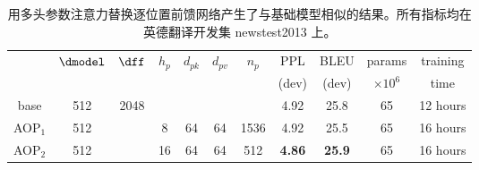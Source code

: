 \begin{table}[h]
\caption{用多头参数注意力替换逐位置前馈网络产生了与基础模型相似的结果。所有指标均在英德翻译开发集 newstest2013 上。}
\label{tab:parameter_attention}
\begin{center}
\vspace{-2mm}
\begin{tabular}{c|cccccc|cccc}
\hline\rule{0pt}{2.0ex}
 & \multirow{2}{*}{$\dmodel$} & \multirow{2}{*}{$\dff$} &
\multirow{2}{*}{$h_p$} & \multirow{2}{*}{$d_{pk}$} & \multirow{2}{*}{$d_{pv}$} &
 \multirow{2}{*}{$n_p$} &
 PPL & BLEU & params & training\\
 & & & & & &  & (dev) & (dev) & $\times10^6$ & time \\
\hline\rule{0pt}{2.0ex}
base & 512 & 2048 & & & & & 4.92 & 25.8 & 65 & 12 hours\\
\hline\rule{0pt}{2.0ex}
AOP$_1$ & 512 & & 8 & 64 & 64 & 1536 & 4.92& 25.5  & 65 & 16 hours\\
AOP$_2$ & 512 & & 16 & 64 & 64 & 512 & \textbf{4.86} & \textbf{25.9}  & 65 & 16 hours \\
\hline
\end{tabular}
\end{center}
\end{table}
